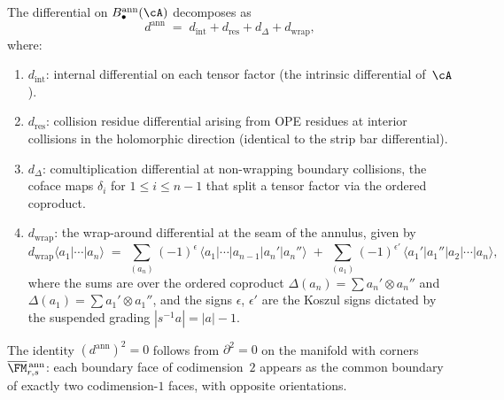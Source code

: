 \begin{theorem}%
\label{thm:annular-bar-differential}%
%
The differential on $B^{\mathrm{ann}}_\bullet(\cA)$
decomposes as
\[
d^{\mathrm{ann}}
\;=\;
d_{\mathrm{int}}+d_{\mathrm{res}}
 +d_\Delta+d_{\mathrm{wrap}},
\]
where:
\begin{enumerate}[label=\textup{(\alph*)}]
\item $d_{\mathrm{int}}$: internal differential on each
 tensor factor (the intrinsic differential of~$\cA$).

\item $d_{\mathrm{res}}$: collision residue differential
 arising from OPE residues at interior collisions in the
 holomorphic direction
 (identical to the strip bar differential).

\item $d_\Delta$: comultiplication differential at
 non-wrapping boundary collisions, the coface maps
 $\delta_i$ for $1\le i\le n-1$ that split a tensor factor
 via the ordered coproduct.

\item $d_{\mathrm{wrap}}$: the wrap-around differential
 at the seam of the annulus, given by
\begin{equation}\label{eq:d-wrap}
d_{\mathrm{wrap}}\langle a_1|\cdots|a_n\rangle
\;=\;
\sum_{(a_n)}
(-1)^{\epsilon}\,
\langle a_1|\cdots|a_{n-1}|a_n'|a_n''\rangle
\;+\;
\sum_{(a_1)}
(-1)^{\epsilon'}\,
\langle a_1'|a_1''|a_2|\cdots|a_n\rangle,
\end{equation}
where the sums are over the ordered coproduct
$\Delta(a_n)=\sum a_n'\otimes a_n''$ and
$\Delta(a_1)=\sum a_1'\otimes a_1''$, and the signs
$\epsilon$, $\epsilon'$ are the Koszul signs dictated by the
suspended grading $|s^{-1}a|=|a|-1$.
\end{enumerate}
The identity $(d^{\mathrm{ann}})^2=0$ follows from
$\partial^2=0$ on the manifold with corners
$\overline{\FM}{}^{\,\mathrm{ann}}_{r,s}$: each boundary
face of codimension~$2$ appears as the common boundary
of exactly two codimension-$1$ faces, with opposite orientations.
\end{theorem}

